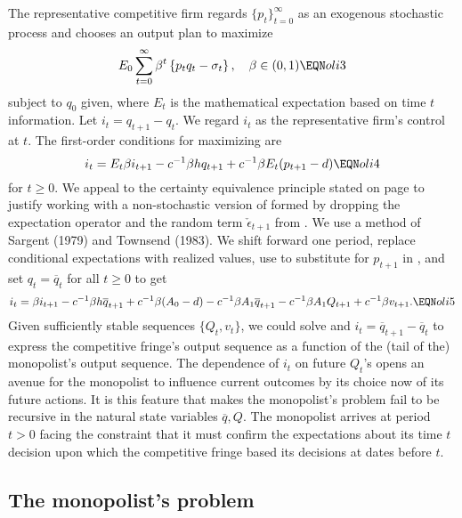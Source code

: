  The representative competitive firm regards $\{p_t\}_{t=0}^\infty$
as an exogenous  stochastic process and chooses
an output plan to
maximize
$$ E_0 \sum_{t=0}^\infty \beta^t \left\{
 p_t q_t - \sigma_t
 \right\}, \quad \beta \in(0,1) \EQN oli3 $$
subject to $q_0$ given, where  %
$E_t$ is the mathematical expectation based on time
$t$ information.
Let $i_t = q_{t+1} - q_t.$  We
regard $i_t$ as the representative firm's control at $t$.  The
first-order conditions
 for maximizing  are
$$  i_t =  E_t  \beta i_{t+1} -c^{-1} \beta h  q_{t+1}
  + c^{-1} \beta  E_t( p_{t+1} -d) \EQN oli4   $$
for $t \geq 0$.
We appeal to the  certainty equivalence principle stated on
page  to justify working with
a non-stochastic version of  formed by dropping
the expectation operator and the random term $\check \epsilon_{t+1}$
from .   We use
a method of Sargent (1979) and Townsend
(1983).
  We shift   forward one period, replace conditional
expectations with realized values,  use  to  substitute
for $p_{t+1}$ in  , and set $q_t = \overline q_t$ for all
$t\geq 0$ to get
$$ i_t = \beta i_{t+1}  - c^{-1} \beta h \overline q_{t+1}
 + c^{-1} \beta (A_0-d) - c^{-1} \beta    A_1 \overline q_{t+1}
  -  c^{-1} \beta    A_1 Q_{t+1} + c^{-1} \beta    v_{t+1}. \EQN oli5 $$
Given sufficiently stable sequences $\{Q_t, v_t\}$, we could solve 
and $i_t = \overline q_{t+1} - \overline q_t$ to
express the competitive fringe's
output sequence  as a function of the (tail of the)
monopolist's output sequence.
The dependence of $i_t$ on future $Q_t$'s opens an avenue for the monopolist to influence current outcomes by its choice now
of its future actions.  
  It is this feature that makes the  monopolist's problem fail  to be
recursive in the natural state variables $\overline q, Q$.   The monopolist
arrives at period $t >0$ facing the  constraint that it must
 confirm the expectations about its time $t$ decision
upon which the competitive fringe   based its decisions at dates
before $t$.

\subsection{The monopolist's problem}


